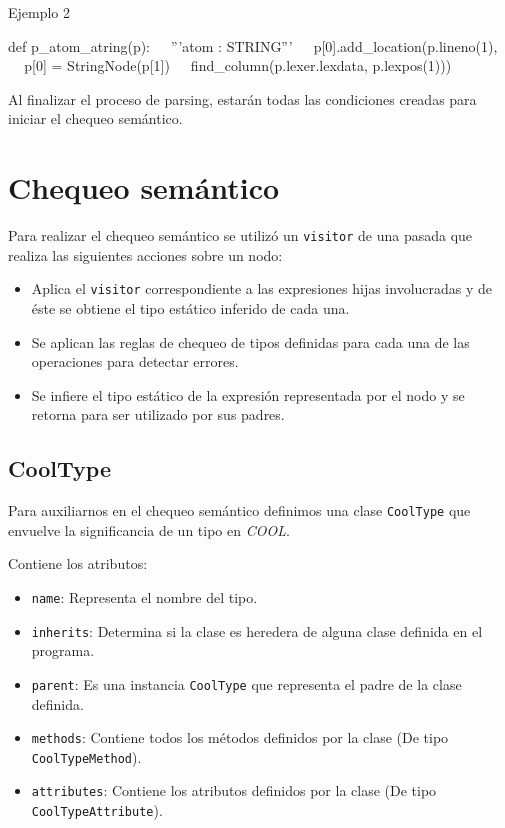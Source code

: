 \documentclass[a4paper,10pt,twocolumn]{article}
\begin{document}
\begin{algorithm}
	\caption{Ejemplo 2}
	\begin{algorithmic}
		\STATE def p\_atom\_atring(p):
		\STATE $\;\;\; $ '''atom : STRING'''
		\STATE $\;\;\; $ p[0].add\_location(p.lineno(1),
		\STATE $\;\;\; $ p[0] = StringNode(p[1])
		\STATE $\;\;\; $ find\_column(p.lexer.lexdata, p.lexpos(1)))
	\end{algorithmic}
\end{algorithm}

Al finalizar el proceso de parsing, estarán todas las condiciones creadas para iniciar el chequeo semántico.

\section{Chequeo semántico}

Para realizar el chequeo semántico se utilizó un \lstinline|visitor| de una pasada que realiza las siguientes acciones sobre un nodo:

\begin{itemize}
	\item Aplica el \lstinline|visitor| correspondiente a las expresiones hijas involucradas y de éste se obtiene el tipo estático inferido de cada una. 
	\item Se aplican las reglas de chequeo de tipos definidas para cada una de las operaciones para detectar errores. 
	\item Se infiere el tipo estático de la expresión representada por el nodo y se retorna para ser utilizado por sus padres. 
\end{itemize}

\subsection{CoolType}
Para auxiliarnos en el chequeo semántico definimos una clase \lstinline|CoolType| que envuelve la significancia de un tipo en \textit{COOL}. 

Contiene los atributos:

\begin{itemize}
	\item \lstinline|name|: Representa el nombre del tipo. 
	\item \lstinline|inherits|: Determina si la clase es heredera de alguna clase definida en el programa. 
	\item \lstinline|parent|: Es una instancia \lstinline|CoolType| que representa el padre de la clase definida. 
	\item \lstinline|methods|: Contiene todos los métodos definidos por la clase (De tipo \lstinline|CoolTypeMethod|). 
	\item \lstinline|attributes|: Contiene los atributos definidos por la clase (De tipo \lstinline|CoolTypeAttribute|).
\end{itemize}
\end{document}
